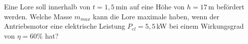\begin{ExerciseBlock}
Eine Lore soll innerhalb von $t=1,5\,$min auf eine Höhe von $h=17\,$m befördert werden. Welche Masse $m_{max}$ kann die Lore maximale haben, wenn der Antriebsmotor eine elektrische Leistung $P_{el} = 5,5\,$kW bei einem Wirkungsgrad von $\eta = 60\%$ hat?
\end{ExerciseBlock}
